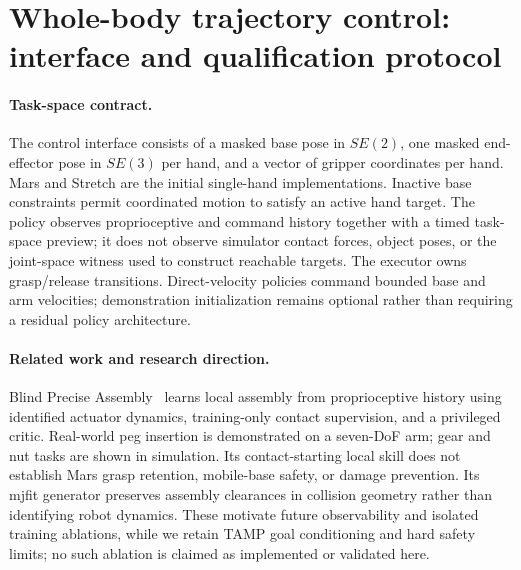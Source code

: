 \section{Whole-body trajectory control: interface and qualification protocol}
\label{app:whole_body_control}

\paragraph{Task-space contract.}
The control interface consists of a masked base pose in $SE(2)$, one masked
end-effector pose in $SE(3)$ per hand, and a vector of gripper coordinates per
hand. Mars and Stretch are the initial single-hand implementations. Inactive
base constraints permit coordinated motion to satisfy an active hand target.
The policy observes proprioceptive and command history together with a timed
task-space preview; it does not observe simulator contact forces, object poses,
or the joint-space witness used to construct reachable targets. The executor
owns grasp/release transitions. Direct-velocity policies command bounded base
and arm velocities; demonstration initialization remains optional rather than
requiring a residual policy architecture.

\paragraph{Related work and research direction.}
Blind Precise Assembly~\cite{bronars2026blindpreciseassemblyproprioceptive}
learns local assembly from proprioceptive history using identified actuator
dynamics, training-only contact supervision, and a privileged critic. Real-world
peg insertion is demonstrated on a seven-DoF arm; gear and nut tasks are shown
in simulation. Its contact-starting local skill does not establish Mars grasp
retention, mobile-base safety, or damage prevention. Its mjfit generator preserves
assembly clearances in collision geometry rather than identifying robot dynamics.
These motivate future observability and isolated training ablations, while we
retain TAMP goal conditioning and hard safety limits; no such ablation is claimed
as implemented or validated here.


